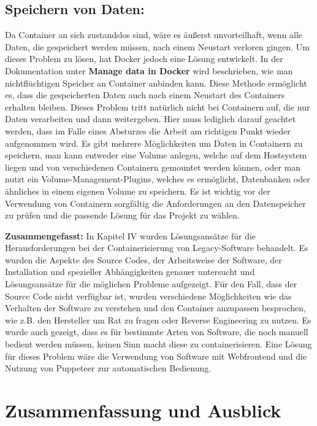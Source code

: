 \subsection{Speichern von Daten:}
Da Container an sich zustandslos sind, wäre es äußerst unvorteilhaft, wenn alle Daten, die gespeichert werden müssen, nach einem Neustart verloren gingen.
Um dieses Problem zu lösen, hat Docker jedoch eine Lösung entwickelt. In der Dokumentation unter \textbf{Manage data in Docker} \cite{dockerrstorage} wird beschrieben, wie man nichtflüchtigen Speicher an Container anbinden kann. Diese Methode ermöglicht es, dass die gespeicherten Daten auch nach einem Neustart des Containers erhalten bleiben. Dieses Problem tritt natürlich nicht bei Containern auf, die nur Daten verarbeiten und dann weitergeben. Hier muss lediglich darauf geachtet werden, dass im Falle eines Absturzes die Arbeit am richtigen Punkt wieder aufgenommen wird. Es gibt mehrere Möglichkeiten um Daten in Containern zu speichern, man kann entweder eine Volume anlegen, welche auf dem Hostsystem liegen und von verschiedenen Containern gemountet werden können, oder man nutzt ein Volume-Management-Plugins, welches es ermöglicht, Datenbanken oder ähnliches in einem eigenen Volume zu speichern. Es ist wichtig vor der Verwendung von Containern sorgfältig die Anforderungen an den Datenspeicher zu prüfen und die passende Lösung für das Projekt zu wählen.

\textbf{Zusammengefasst:}
In Kapitel IV wurden Lösungsansätze für die Herausforderungen bei der Containerisierung von Legacy-Software behandelt. Es wurden die Aspekte des Source Codes, der Arbeitsweise der Software, der Installation und spezieller Abhängigkeiten genauer untersucht und Lösungsansätze für die möglichen Probleme aufgezeigt. Für den Fall, dass der Source Code nicht verfügbar ist, wurden verschiedene Möglichkeiten wie das Verhalten der Software zu verstehen und den Container anzupassen besprochen, wie z.B. den Hersteller um Rat zu fragen oder Reverse Engineering zu nutzen. Es wurde auch gezeigt, dass es für bestimmte Arten von Software, die noch manuell bedient werden müssen, keinen Sinn macht diese zu containerisieren. Eine Lösung für dieses Problem wäre die Verwendung von Software mit Webfrontend und die Nutzung von Puppeteer zur automatischen Bedienung.

\section{Zusammenfassung und Ausblick}

